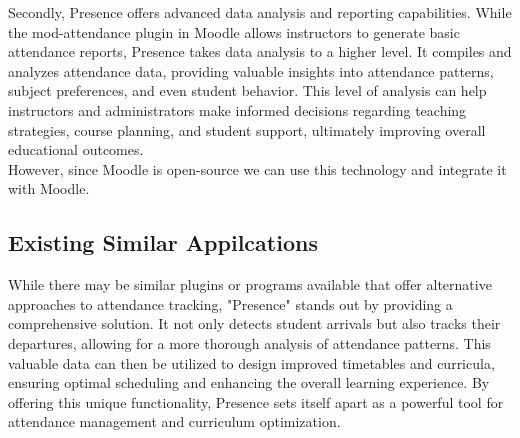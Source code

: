 Secondly, Presence offers advanced data analysis and reporting capabilities. While the mod-attendance plugin in Moodle allows instructors to generate basic attendance reports, Presence takes data analysis to a higher level. It compiles and analyzes attendance data, providing valuable insights into attendance patterns, subject preferences, and even student behavior. This level of analysis can help instructors and administrators make informed decisions regarding teaching strategies, course planning, and student support, ultimately improving overall educational outcomes.\\

However, since Moodle is open-source we can use this technology and integrate it with Moodle.


\subsection{Existing Similar Appilcations}
While there may be similar plugins or programs available that offer alternative approaches to attendance tracking, "Presence" stands out by providing a comprehensive solution. It not only detects student arrivals but also tracks their departures, allowing for a more thorough analysis of attendance patterns. This valuable data can then be utilized to design improved timetables and curricula, ensuring optimal scheduling and enhancing the overall learning experience. By offering this unique functionality, Presence sets itself apart as a powerful tool for attendance management and curriculum optimization.

